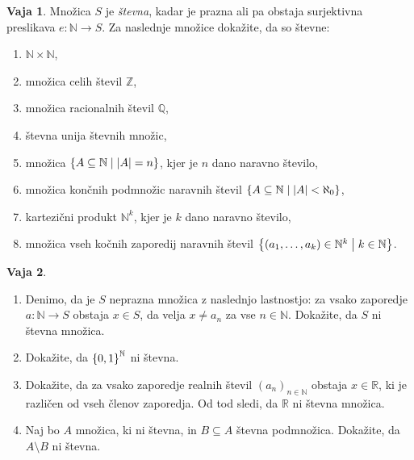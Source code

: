 \documentclass{article}
\newcommand{\NN}{\mathbb{N}}
\newcommand{\ZZ}{\mathbb{Z}}
\newcommand{\QQ}{\mathbb{Q}}
\newcommand{\RR}{\mathbb{R}}
\theoremstyle{definition}
\newtheorem{vaja}{Vaja}
\begin{document}








\begin{vaja}
  Množica $S$ je \emph{števna}, kadar je prazna ali pa obstaja surjektivna preslikava $e\colon \NN \to S$. Za naslednje množice dokažite, da so števne:
  \begin{enumerate}
    \item
      $\NN \times \NN$,
    \item
      množica celih števil $\ZZ$,
    \item
      množica racionalnih števil $\QQ$,
    \item
      števna unija števnih množic,
    \item
      množica $\set{A \subseteq \NN}{|A| = n}$, kjer je $n$ dano naravno število,
    \item
      množica končnih podmnožic naravnih števil $\set{A \subseteq \NN}{|A| < \aleph_0}$,
    \item
      kartezični produkt $\NN^k$, kjer je $k$ dano naravno število,
    \item
      množica vseh kočnih zaporedij naravnih števil $\set{(a_1, \ldots, a_k) \in \NN^k}{k \in \NN}$.
  \end{enumerate}
\end{vaja}

\begin{vaja}
  \
  \begin{enumerate}
    \item
      Denimo, da je $S$ neprazna množica z naslednjo lastnostjo: za vsako zaporedje $a\colon \NN \to S$ obstaja $x \in S$, da velja $x \neq a_n$ za vse $n \in \NN$. Dokažite, da $S$ ni števna množica.
    \item
      Dokažite, da $\set{0,1}^\NN$ ni števna.
    \item
      Dokažite, da za vsako zaporedje realnih števil $(a_n)_{n \in \NN}$ obstaja $x \in \RR$, ki je različen od vseh členov zaporedja. Od tod sledi, da $\RR$ ni števna množica.
    \item
      Naj bo $A$ množica, ki ni števna, in $B \subseteq A$ števna podmnožica. Dokažite, da $A \setminus B$ ni števna.
  \end{enumerate}
\end{vaja}
\end{document}
